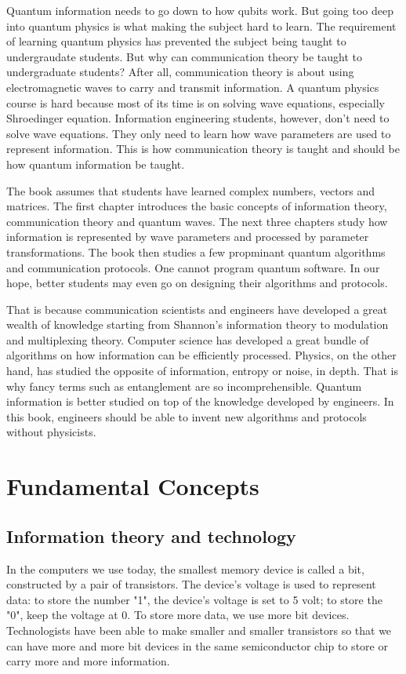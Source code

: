 \documentclass[oneside, letter, 12pt]{book}
\begin{document}
Quantum information needs to go down to how qubits work. But going too deep into quantum physics is what making the subject hard to learn. The requirement of learning quantum physics has prevented the subject being taught to undergraudate students. But why can communication theory be taught to undergraduate students? After all, communication theory is about using electromagnetic waves to carry and transmit information. A quantum physics course is hard because most of its time is on solving wave equations, especially Shroedinger equation. Information engineering students, however, don't need to solve wave equations. They only need to learn how wave parameters are used to represent information. This is how communication theory is taught and should be how quantum information be taught.

The book assumes that students have learned complex numbers, vectors and matrices. The first chapter introduces the basic concepts of information theory, communication theory and quantum waves. The next three chapters study how information is represented by wave parameters and processed by parameter transformations. The book then studies a few propminant quantum algorithms and communication protocols. One cannot program quantum software. In our hope, better students may even go on designing their algorithms and protocols.


That is because communication scientists and engineers have developed a great wealth of knowledge starting from Shannon's information theory to modulation and multiplexing theory. Computer science has developed a great bundle of algorithms on how information can be efficiently processed. Physics, on the other hand, has studied the opposite of information, entropy or noise, in depth. That is why fancy terms such as entanglement are so incomprehensible. Quantum information is better studied on top of the knowledge developed by engineers. In this book, engineers should be able to invent new algorithms and protocols without physicists.

\setcounter{tocdepth}{3}
\tableofcontents

\mainmatter

\chapter{Fundamental Concepts}\label{c-intro}

\section{Information theory and technology}
In the computers we use today, the smallest memory device is called a bit, constructed by a pair of transistors. The device's voltage is used to represent data: to store the number "1", the device's voltage is set to 5 volt; to store the "0", keep the voltage at 0. To store more data, we use more bit devices. Technologists have been able to make smaller and smaller transistors so that we can have more and more bit devices in the same semiconductor chip to store or carry more and more information.
\end{document}
